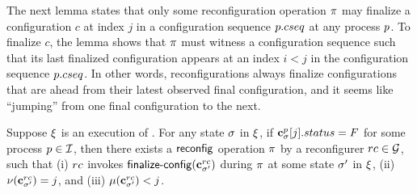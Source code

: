 The next lemma states that only some reconfiguration operation $\pi$ may finalize a configuration $c$ at index $j$ in a configuration sequence $p.cseq$ at any process $p$.
To finalize $c$, the lemma shows that $\pi$ must witness a configuration
sequence such that its last finalized configuration appears at an index $i<j$ in the configuration sequence $p.cseq$. In other words,  reconfigurations always finalize configurations that are ahead from their
latest observed final configuration, and it seems like ``jumping'' from one final configuration to the next.

\begin{lemma} %
\label{lem:recon:jump}
Suppose $\EX$ is an execution of \ares{}. 
 For any state $\sigma$ in $\EX$, if $\mathbf{c}^{p}_{\sigma}[j].status = F$ for some process $p\in\mathcal{I}$, 
 then there exists a $\act{reconfig}$ operation $\pi$ by a reconfigurer $rc\in\mathcal{G}$, such that
 (i) $rc$ invokes $\act{finalize-config}(\cvec{\rec}{\state'})$ during $\pi$ at some state $\sigma'$ in $\EX$, 
 (ii) $\nu(\mathbf{c}^{rc}_{\sigma'}) = j$, and (iii) $\mu(\mathbf{c}^{rc}_{\sigma'}) < j$. 
% 
\end{lemma}
%

